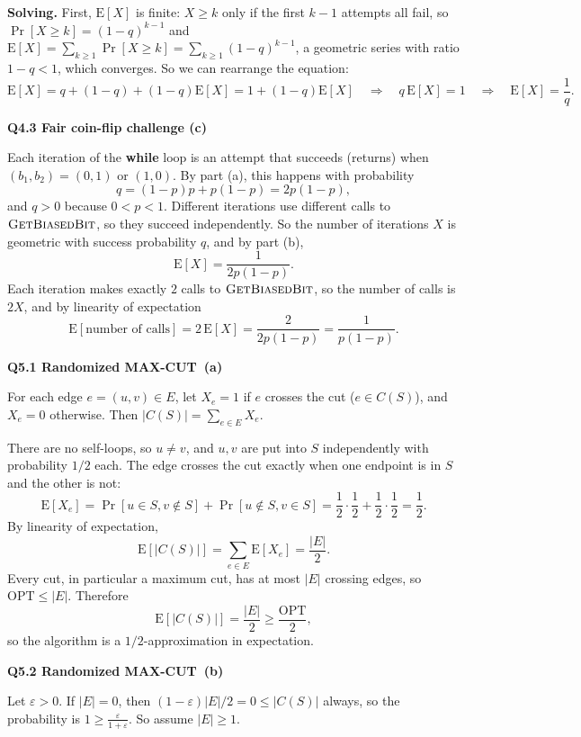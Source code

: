 \documentclass[11pt]{article}
\newcommand{\abs}[1]{\left|#1\right|}
\newcommand{\MaxCut}{\textsf{MAX-CUT}}
\newcommand{\OPT}{\mathrm{OPT}}
\newcommand{\Ex}{\mathrm{E}}
\newcommand{\algo}[1]{\textsc{#1}}
\newcommand{\qpage}[1]{\clearpage\noindent\textbf{\large #1}\par\medskip}
\begin{document}
\textbf{Solving.}
First, $\Ex[X]$ is finite: $X \geq k$ only if the first $k - 1$ attempts all fail, so $\Pr[X \geq k] = (1-q)^{k-1}$ and
$\Ex[X] = \sum_{k \geq 1} \Pr[X \geq k] = \sum_{k \geq 1} (1-q)^{k-1}$, a geometric series with ratio $1 - q < 1$, which converges.
So we can rearrange the equation:
\[
  \Ex[X] = q + (1 - q) + (1 - q)\Ex[X] = 1 + (1 - q)\Ex[X]
  \quad\Longrightarrow\quad q\, \Ex[X] = 1
  \quad\Longrightarrow\quad \Ex[X] = \frac{1}{q}.
\]

\qpage{Q4.3 Fair coin-flip challenge (c)}

Each iteration of the \textbf{while} loop is an attempt that succeeds (returns) when $(b_1, b_2) = (0, 1)$ or $(1, 0)$.
By part (a), this happens with probability
\[
  q = (1-p)p + p(1-p) = 2p(1-p),
\]
and $q > 0$ because $0 < p < 1$.
Different iterations use different calls to $\algo{GetBiasedBit}$, so they succeed independently.
So the number of iterations $X$ is geometric with success probability $q$, and by part (b),
\[
  \Ex[X] = \frac{1}{2p(1-p)}.
\]
Each iteration makes exactly $2$ calls to $\algo{GetBiasedBit}$, so the number of calls is $2X$, and by linearity of expectation
\[
  \Ex[\text{number of calls}] = 2\,\Ex[X] = \frac{2}{2p(1-p)} = \frac{1}{p(1-p)}.
\]

\qpage{Q5.1 Randomized \MaxCut\ (a)}

For each edge $e = (u, v) \in E$, let $X_e = 1$ if $e$ crosses the cut ($e \in C(S)$), and $X_e = 0$ otherwise.
Then $\abs{C(S)} = \sum_{e \in E} X_e$.

There are no self-loops, so $u \neq v$, and $u, v$ are put into $S$ independently with probability $1/2$ each.
The edge crosses the cut exactly when one endpoint is in $S$ and the other is not:
\[
  \Ex[X_e] = \Pr[u \in S, v \notin S] + \Pr[u \notin S, v \in S] = \frac{1}{2} \cdot \frac{1}{2} + \frac{1}{2} \cdot \frac{1}{2} = \frac{1}{2}.
\]
By linearity of expectation,
\[
  \Ex[\abs{C(S)}] = \sum_{e \in E} \Ex[X_e] = \frac{\abs{E}}{2}.
\]
Every cut, in particular a maximum cut, has at most $\abs{E}$ crossing edges, so $\OPT \leq \abs{E}$.
Therefore
\[
  \Ex[\abs{C(S)}] = \frac{\abs{E}}{2} \geq \frac{\OPT}{2},
\]
so the algorithm is a $1/2$-approximation in expectation.

\qpage{Q5.2 Randomized \MaxCut\ (b)}

Let $\varepsilon > 0$.
If $\abs{E} = 0$, then $(1-\varepsilon)\abs{E}/2 = 0 \leq \abs{C(S)}$ always, so the probability is $1 \geq \frac{\varepsilon}{1+\varepsilon}$.
So assume $\abs{E} \geq 1$.
\end{document}
